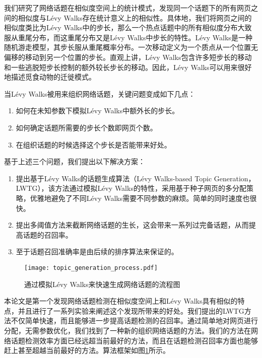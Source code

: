 我们研究了网络话题在相似度空间上的统计模式，发现同一个话题下的所有网页之间的相似度与L\'{e}vy Walks存在统计意义上的相似性。具体地，我们将网页之间的相似度类比为L\'{e}vy Walks中的步长，那么一个热点话题中的所有相似度分布大致服从重尾分布，而这重尾分布又是L\'{e}vy Walks中步长的特性。L\'{e}vy Walks是一种随机游走模型，其步长服从重尾概率分布。一次移动定义为一个质点从一个位置无偏移的移动到另一个位置的步长。直观上讲，L\'{e}vy Walks包含许多短步长的移动和一些逃脱短步长控制的额外较长步长的移动。因此，L\'{e}vy Walks可以用来很好地描述觅食动物的迁徙模式。

当L\'{e}vy Walks被用来组织网络话题，关键问题变成如下几点：
\begin{enumerate}
\renewcommand{\labelenumi}{\theenumi)}
    \item 如何在未知参数下模拟L\'{e}vy Walks中额外长的步长。
    \item 如何确定话题所需要的步长个数即网页个数。
    \item 在组织话题的时候选择这个步长是否能带来好处。
\end{enumerate}
基于上述三个问题，我们提出以下解决方案：
\begin{enumerate}
\renewcommand{\labelenumi}{\theenumi)}
    \item 提出基于L\'{e}vy Walks的话题生成算法（L\'{e}vy Walks-based Topic Generation，LWTG），该方法通过模拟L\'{e}vy Walks的特性，采用基于种子网页的多分配策略，优雅地避免了不同L\'{e}vy Walks需要不同参数的麻烦。简单的同时速度也很快。
    \item 提出多阈值方法来截断网络话题的生长，这会带来一系列过完备话题，从而提高话题的召回率。
    \item 至于话题召回准确率是由后续的排序算法来保证的。
\end{enumerate}

\begin{figure}[!htbp]
    \centering
    \texttt{[image: topic\_generation\_process.pdf]}
    \caption{通过模拟L\'evy Walks来快速生成网络话题的流程图}
    \label{fig:topic_generation_process}
\end{figure}

本论文是第一个发现网络话题检测在相似度空间上和L\'{e}vy Walks具有相似的特点，并且进行了一系列实验来阐述这个发现所带来的好处。我们提出的LWTG方法不仅简单快速，而且能够进一步提高话题检测的召回率。通过简单地对网页进行分配，无需参数优化，我们找到了一种新的组织网络话题的方法。我们的方法在网络话题检测效率方面已经远超当前最好的方法，而且在话题检测召回率方面也能够赶上甚至超越当前最好的方法。算法框架如图\ref{fig:topic_generation_process}所示。

